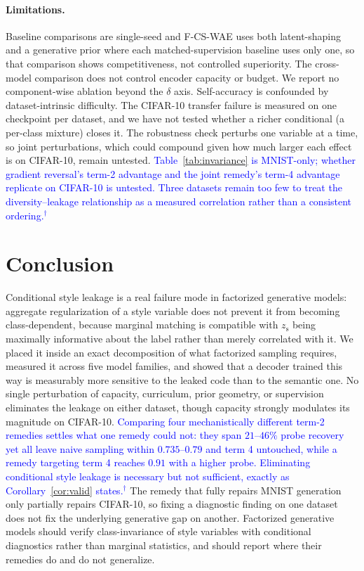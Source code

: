 \documentclass[letterpaper]{article} %
\newcommand{\pj}[1]{\textcolor{blue}{#1$^{\dagger}$}}
\newcommand{\ours}{F-CS-WAE}
\newcommand{\zs}{z_{\mathrm{s}}}
\begin{document}
\paragraph{Limitations.}
Baseline comparisons are single-seed and \ours{} uses both latent-shaping and
a generative prior where each matched-supervision baseline uses only one, so
that comparison shows competitiveness, not controlled superiority. The
cross-model comparison does not control encoder capacity or budget. We report
no component-wise ablation beyond the $\delta$ axis. Self-accuracy is
confounded by dataset-intrinsic difficulty. The CIFAR-10 transfer failure is
measured on one checkpoint per dataset, and we have not tested whether a
richer conditional (a per-class mixture) closes it. The robustness check
perturbs one variable at a time, so joint perturbations, which could compound
given how much larger each effect is on CIFAR-10, remain untested.
\pj{Table~\ref{tab:invariance} is MNIST-only; whether gradient reversal's
term-2 advantage and the joint remedy's term-4 advantage replicate on
CIFAR-10 is untested. Three datasets remain too few to treat the
diversity--leakage relationship as a measured correlation rather than a
consistent ordering.}

\section{Conclusion}

Conditional style leakage is a real failure mode in factorized generative
models: aggregate regularization of a style variable does not prevent it from
becoming class-dependent, because marginal matching is compatible with $\zs$
being maximally informative about the label rather than merely correlated
with it. We placed it inside an exact decomposition of what factorized
sampling requires, measured it across five model families, and showed that a
decoder trained this way is measurably more sensitive to the leaked code than
to the semantic one. No single perturbation of capacity, curriculum, prior
geometry, or supervision eliminates the leakage on either dataset, though
capacity strongly modulates its magnitude on CIFAR-10. \pj{Comparing four
mechanistically different term-2 remedies settles what one remedy could not:
they span $21$--$46\%$ probe recovery yet all leave naive sampling within
$0.735$--$0.79$ and term 4 untouched, while a remedy targeting term 4 reaches
$0.91$ with a higher probe. Eliminating conditional style leakage is
necessary but not sufficient, exactly as Corollary~\ref{cor:valid} states.}
The remedy that fully repairs MNIST generation only partially repairs
CIFAR-10, so fixing a diagnostic finding on one dataset does not fix the
underlying generative gap on another. Factorized generative models should
verify class-invariance of style variables with conditional diagnostics
rather than marginal statistics, and should report where their remedies do
and do not generalize.


\end{document}

